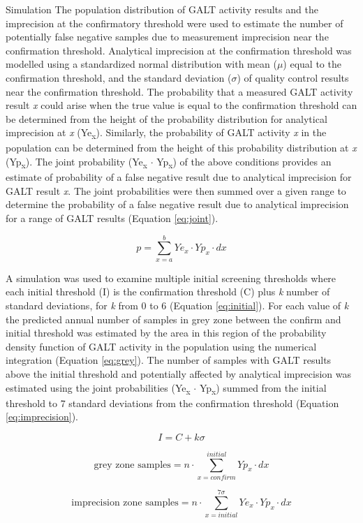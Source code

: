 \documentclass[review]{elsarticle}
\begin{document}
\begin{frame}[label={sec:org868be53}]{Simulation}
The population distribution of GALT activity results and the
imprecision at the confirmatory threshold were used to estimate the
number of potentially false negative samples due to measurement
imprecision near the confirmation threshold. Analytical imprecision at
the confirmation threshold was modelled using a standardized normal
distribution with mean (\(\mu\)) equal to the confirmation threshold, and
the standard deviation (\(\sigma\)) of quality control results near the
confirmation threshold. The probability that a measured GALT activity
result \emph{x} could arise when the true value is equal to the confirmation
threshold can be determined from the height of the probability
distribution for analytical imprecision at \emph{x} (Ye\textsubscript{x}). Similarly, the
probability of GALT activity \emph{x} in the population can be determined
from the height of this probability distribution at \emph{x} (Yp\textsubscript{x}). The
joint probability (Ye\textsubscript{x} \(\cdot\) Yp\textsubscript{x}) of the above conditions provides
an estimate of probability of a false negative result due to analytical
imprecision for GALT result \emph{x}. The joint probabilities were then
summed over a given range to determine the probability of a false
negative result due to analytical imprecision for a range of GALT
results (Equation \ref{eq:joint}).


\begin{equation}\label{eq:joint}
p = \sum_{x=a}^b Ye_x \cdot Yp_x \cdot dx
\end{equation}

A simulation was used to examine multiple initial screening thresholds
where each initial threshold (I) is the confirmation threshold (C)
plus \emph{k} number of standard deviations, for \emph{k} from 0 to 6 (Equation
\ref{eq:initial}). For each value of \emph{k} the predicted annual number
of samples in grey zone between the confirm and initial threshold was
estimated by the area in this region of the probability density
function of GALT activity in the population using the numerical
integration (Equation \ref{eq:grey}). The number of samples with GALT
results above the initial threshold and potentially affected by
analytical imprecision was estimated using the joint probabilities
(Ye\textsubscript{x} \(\cdot\) Yp\textsubscript{x}) summed from the initial threshold to 7 standard
deviations from the confirmation threshold (Equation
\ref{eq:imprecision}).

\begin{equation}\label{eq:initial}
I = C + k\sigma 
\end{equation}

\begin{equation}\label{eq:grey}
\text{grey zone samples}  =  n \cdot \sum_{x=confirm}^{initial} Yp_x \cdot dx
\end{equation}

\begin{equation}\label{eq:imprecision}
\text{imprecision zone samples}  =  n \cdot \sum_{x=initial}^{7\sigma} Ye_x \cdot Yp_x \cdot dx
\end{equation}
\end{frame}
\end{document}

